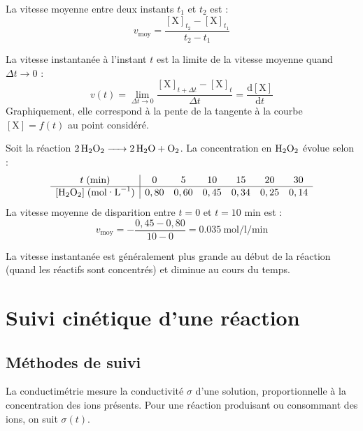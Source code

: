 \begin{definition}
La vitesse moyenne entre deux instants $t_1$ et $t_2$ est :
\[
v_{\text{moy}} = \frac{[\mathrm{X}]_{t_2} - [\mathrm{X}]_{t_1}}{t_2 - t_1}
\]
\end{definition}

\begin{definition}
La vitesse instantanée à l'instant $t$ est la limite de la vitesse moyenne quand $\Delta t \to 0$ :
\[
v(t) = \lim_{\Delta t \to 0} \frac{[\mathrm{X}]_{t+\Delta t} - [\mathrm{X}]_{t}}{\Delta t} = \frac{\mathrm{d}[\mathrm{X}]}{\mathrm{d}t}
\]
Graphiquement, elle correspond à la pente de la tangente à la courbe $[\mathrm{X}] = f(t)$ au point considéré.
\end{definition}

\begin{exemple}
Soit la réaction $\ce{2 H2O2 -> 2 H2O + O2}$. La concentration en $\ce{H2O2}$ évolue selon :
\[
\begin{array}{c|cccccc}
t\;(\text{min}) & 0 & 5 & 10 & 15 & 20 & 30 \\ \hline
[\ce{H2O2}]\;(\text{mol·L}^{-1}) & 0,80 & 0,60 & 0,45 & 0,34 & 0,25 & 0,14
\end{array}
\]
La vitesse moyenne de disparition entre $t=0$ et $t=10$ min est :
\[
v_{\text{moy}} = -\frac{0,45 - 0,80}{10 - 0} = \SI{0,035}{\mol\per\litre\per\minute}
\]
\end{exemple}

\begin{remarque}
La vitesse instantanée est généralement plus grande au début de la réaction (quand les réactifs sont concentrés) et diminue au cours du temps.
\end{remarque}

\section{Suivi cinétique d'une réaction}

\subsection{Méthodes de suivi}

\begin{experience}
La conductimétrie mesure la conductivité $\sigma$ d'une solution, proportionnelle à la concentration des ions présents. Pour une réaction produisant ou consommant des ions, on suit $\sigma(t)$.
\end{experience}

